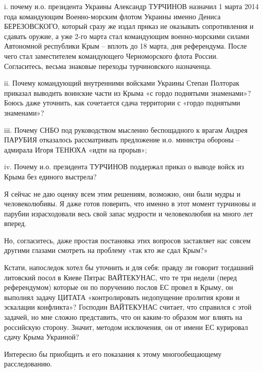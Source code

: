 i. почему и.о. президента Украины Александр ТУРЧИНОВ назначил 1 марта 2014 года
командующим Военно-морским флотом Украины именно Дениса БЕРЕЗОВСКОГО, который
сразу же издал приказ не оказывать сопротивления и сдавать оружие, а уже 2-го
марта стал командующим военно-морскими силами Автономной республики Крым –
вплоть до 18 марта, дня референдума. После чего стал заместителем командующего
Черноморского флота России. Согласитесь, весьма знаковые переходы турчиновского
назначенца.

ii. Почему командующий внутренними войсками Украины Степан Полторак приказал
выводить воинские части из Крыма «с гордо поднятыми знаменами»? Боюсь даже
уточнить, как сочетается сдача территории с «гордо поднятыми знаменами»?

iii. Почему СНБО под руководством мысленно беспощадного к врагам Андрея ПАРУБИЯ
отказалось рассматривать предложение и.о. министра обороны – адмирала Игоря
ТЕНЮХА «идти на прорыв»;

iv. Почему и.о. президента ТУРЧИНОВ поддержал приказ о выводе войск из Крыма
без единого выстрела?

Я сейчас не даю оценку всем этим решениям, возможно, они были мудры и
человеколюбивы. Я даже готов поверить, что именно в этот момент турчиновы и
парубии израсходовали весь свой запас мудрости и человеколюбия на много лет
вперед.

Но, согласитесь, даже простая постановка этих вопросов заставляет нас совсем
другими глазами смотреть на проблему «так кто же сдал Крым?»   

Кстати, напоследок хотел бы уточнить и для себя: правду ли говорит тогдашний
литовский посол в Киеве Пятрас ВАЙТЕКУНАС, что те три недели (перед
референдумом) которые он по поручению послов ЕС провел в Крыму, он выполнял
задачу ЦИТАТА «контролировать недопущение пролития крови и эскалации
конфликта»? Господин ВАЙТЕКУНАС считает, что справился с этой задачей, но мне
сложно представить, что он каким-то образом мог влиять на российскую сторону.
Значит, методом исключения, он от имени ЕС курировал сдачу Крыма Украиной? 

Интересно бы приобщить и его показания к этому многообещающему расследованию.

